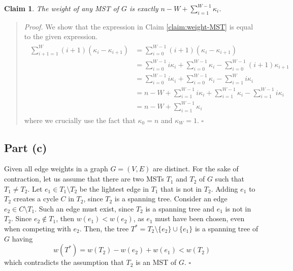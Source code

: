 \documentclass[9pt]{article}
\newtheorem{claim}{Claim}
\begin{document}
\begin{claim}
    The weight of any MST of $G$ is exactly $n - W + \sum_{i=1}^{W-1} \kappa_{i}$.
\end{claim}
\begin{quote}
\textit{Proof.}
We show that the expression in Claim \ref{claim:weight-MST} is equal to the given expression.
\begin{align}
    \begin{split}
        \sum_{i+1=1}^{W} (i + 1) (\kappa_{i} - \kappa_{i+1})
        &= \sum_{i=0}^{W-1} (i + 1) (\kappa_{i} - \kappa_{i+1}) \\
        &= \sum_{i=0}^{W-1} i \kappa_{i} + \sum_{i=0}^{W-1} \kappa_{i} - \sum_{i=0}^{W-1} (i + 1) \kappa_{i+1} \\
        &= \sum_{i=0}^{W-1} i \kappa_{i} + \sum_{i=0}^{W-1} \kappa_{i} - \sum_{i=1}^{W} i \kappa_{i} \\
        &= n - W + \sum_{i=1}^{W-1} i \kappa_{i} + \sum_{i=1}^{W-1} \kappa_{i} - \sum_{i=1}^{W-1} i \kappa_{i} \\
        &= n - W + \sum_{i=1}^{W-1} \kappa_{i}
    \end{split}
\end{align}
where we crucially use the fact that $\kappa_{0} = n$ and $\kappa_{W} = 1$.
\hfill $\square$
\end{quote}

\subsection*{Part (c)}
Given all edge weights in a graph $G = (V, E)$ are distinct. For the sake of contraction,
let us assume that there are two MSTs $T_{1}$ and $T_{2}$ of $G$ such that $T_{1} \neq T_{2}$.
Let $e_{1} \in T_{1} \setminus T_{2}$ be the lightest edge in $T_{1}$ that is not in $T_{2}$.
Adding $e_{1}$ to $T_{2}$ creates a cycle $C$ in $T_{2}$, since $T_{2}$ is a spanning tree.
Consider an edge $e_{2} \in C \setminus T_{1}$. Such an edge must exist, since $T_{2}$ is a
spanning tree and $e_{1}$ is not in $T_{2}$. Since $e_{2} \notin T_{1}$, then
$w(e_{1}) < w(e_{2})$, as $e_{1}$ must have been chosen, even when competing with $e_{2}$.
Then, the tree $T^{*} = T_{2} \setminus \{e_{2}\} \cup \{e_{1}\}$ is a spanning tree of $G$ having
\begin{equation}
    \label{eq:weight-T}
    w(T^{*}) = w(T_{2}) - w(e_{2}) + w(e_{1}) < w(T_{2})
\end{equation}
which contradicts the assumption that $T_{2}$ is an MST of $G$.
\hfill $\square$
\end{document}
